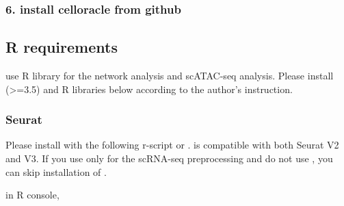 \documentclass[letterpaper,10pt,english]{sphinxmanual}
\begin{document}
%
\begin{sphinxVerbatim}[commandchars=\\\{\}]
      
\end{sphinxVerbatim}


\subsubsection{6. install celloracle from github}
\label{\detokenize{installation/index:install-celloracle-from-github}}
%
\begin{sphinxVerbatim}[commandchars=\\\{\}]
  
\end{sphinxVerbatim}


\subsection{R requirements}
\label{\detokenize{installation/index:r-requirements}}
 use R library for the network analysis and scATAC-seq analysis.
Please install  (\textgreater{}=3.5) and R libraries below according to the author’s instruction.


\subsubsection{Seurat}
\label{\detokenize{installation/index:id3}}
Please install  with the following r-script or  .
 is compatible with both Seurat V2 and V3.
If you use only  for the scRNA-seq preprocessing and do not use  , you can skip installation of .

in R console,

%
\begin{sphinxVerbatim}[commandchars=\\\{\}]
\end{sphinxVerbatim}
\end{document}
